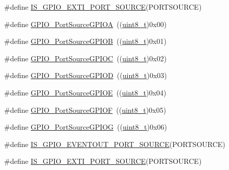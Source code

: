 \begin{DoxyCompactItemize}
\item 
\#define \hyperlink{group___g_p_i_o___port___sources_ga53c3a469f6b286da38bc198acf25e8f1}{I\+S\+\_\+\+G\+P\+I\+O\+\_\+\+E\+X\+T\+I\+\_\+\+P\+O\+R\+T\+\_\+\+S\+O\+U\+R\+CE}(P\+O\+R\+T\+S\+O\+U\+R\+CE)
\item 
\#define \hyperlink{group___g_p_i_o___port___sources_gacddaa6b6535b5de02ba99e75111c4924}{G\+P\+I\+O\+\_\+\+Port\+Source\+G\+P\+I\+OA}~((\hyperlink{_p_e___types_8h_aba7bc1797add20fe3efdf37ced1182c5}{uint8\+\_\+t})0x00)
\item 
\#define \hyperlink{group___g_p_i_o___port___sources_ga20a7ea6589564aee1fd5344bf01e65e5}{G\+P\+I\+O\+\_\+\+Port\+Source\+G\+P\+I\+OB}~((\hyperlink{_p_e___types_8h_aba7bc1797add20fe3efdf37ced1182c5}{uint8\+\_\+t})0x01)
\item 
\#define \hyperlink{group___g_p_i_o___port___sources_ga7511e96933d503ecf7128ebaff613e7e}{G\+P\+I\+O\+\_\+\+Port\+Source\+G\+P\+I\+OC}~((\hyperlink{_p_e___types_8h_aba7bc1797add20fe3efdf37ced1182c5}{uint8\+\_\+t})0x02)
\item 
\#define \hyperlink{group___g_p_i_o___port___sources_ga68309c29660ae328d3699781520e3d21}{G\+P\+I\+O\+\_\+\+Port\+Source\+G\+P\+I\+OD}~((\hyperlink{_p_e___types_8h_aba7bc1797add20fe3efdf37ced1182c5}{uint8\+\_\+t})0x03)
\item 
\#define \hyperlink{group___g_p_i_o___port___sources_ga8b849f35292768d73a9f9a76cac96456}{G\+P\+I\+O\+\_\+\+Port\+Source\+G\+P\+I\+OE}~((\hyperlink{_p_e___types_8h_aba7bc1797add20fe3efdf37ced1182c5}{uint8\+\_\+t})0x04)
\item 
\#define \hyperlink{group___g_p_i_o___port___sources_ga19dfaf7ac2cdf66b697bcd8665b860ef}{G\+P\+I\+O\+\_\+\+Port\+Source\+G\+P\+I\+OF}~((\hyperlink{_p_e___types_8h_aba7bc1797add20fe3efdf37ced1182c5}{uint8\+\_\+t})0x05)
\item 
\#define \hyperlink{group___g_p_i_o___port___sources_ga43af0aa9b42aefa2c7d24dfa9889040b}{G\+P\+I\+O\+\_\+\+Port\+Source\+G\+P\+I\+OG}~((\hyperlink{_p_e___types_8h_aba7bc1797add20fe3efdf37ced1182c5}{uint8\+\_\+t})0x06)
\item 
\#define \hyperlink{group___g_p_i_o___port___sources_ga40d86e5f9f013777038932f57bc6bbef}{I\+S\+\_\+\+G\+P\+I\+O\+\_\+\+E\+V\+E\+N\+T\+O\+U\+T\+\_\+\+P\+O\+R\+T\+\_\+\+S\+O\+U\+R\+CE}(P\+O\+R\+T\+S\+O\+U\+R\+CE)
\item 
\#define \hyperlink{group___g_p_i_o___port___sources_ga53c3a469f6b286da38bc198acf25e8f1}{I\+S\+\_\+\+G\+P\+I\+O\+\_\+\+E\+X\+T\+I\+\_\+\+P\+O\+R\+T\+\_\+\+S\+O\+U\+R\+CE}(P\+O\+R\+T\+S\+O\+U\+R\+CE)
\end{DoxyCompactItemize}


